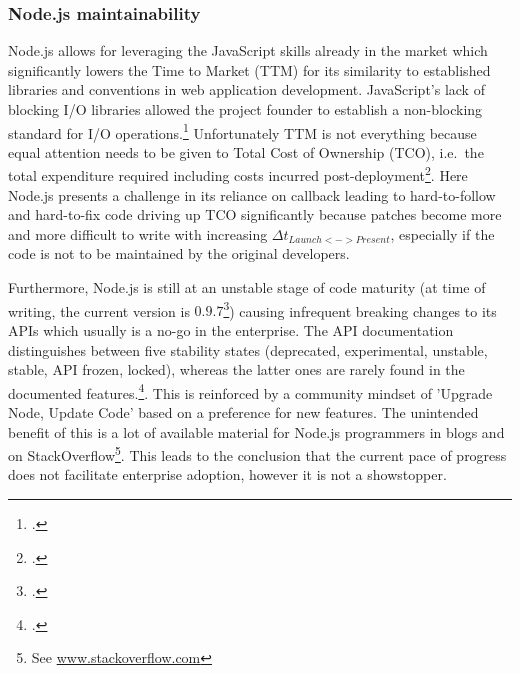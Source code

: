 \subsubsection{Node.js maintainability}

Node.js allows for leveraging the JavaScript skills already in the market which
significantly lowers the Time to Market (TTM)
for its similarity to established libraries and conventions in web application
development. JavaScript's lack of blocking I/O libraries allowed the project
founder to establish a non-blocking standard for I/O operations.\footcite[Cf.][]{Croucher_2012}
Unfortunately TTM is not everything because equal attention needs
to be given to Total Cost of Ownership (TCO), i.e.\ the total expenditure required including costs incurred
post-deployment\footcite[Cf.][203-207]{holtsnider_2010}. 
Here Node.js presents a challenge in its reliance on callback
leading to hard-to-follow and hard-to-fix code driving up TCO significantly
because patches become more and more difficult to write with increasing $\Delta
t_{Launch<->Present}$, especially if the code is not to be maintained by the %
original developers.

Furthermore, Node.js is still at an unstable stage of code maturity (at time of
writing, the current version is $0.9.7$\footcite[Cf.][]{node_unstable_2013})
causing infrequent breaking changes to its APIs which usually is a no-go in the enterprise.
The API documentation distinguishes between five stability states (deprecated,
experimental, unstable, stable, API frozen, locked), whereas the latter ones are
rarely found in the documented features.\footcite[Cf.][] {node_2012}.
This is reinforced by a community mindset of 'Upgrade Node, Update Code' based
on a preference for new features. The unintended benefit of this is a lot of
available material for Node.js programmers in blogs and on
StackOverflow\footnote{See \url{www.stackoverflow.com}}.
This leads to the conclusion that the current pace of progress does not
facilitate enterprise adoption, however it is not a showstopper.

